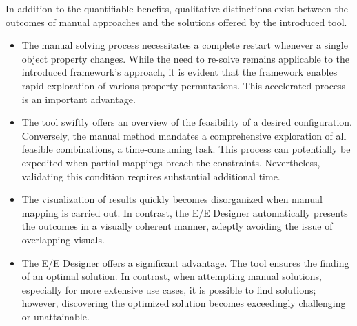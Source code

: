     In addition to the quantifiable benefits, qualitative distinctions exist between the outcomes of manual approaches and the solutions offered by the introduced tool.
    \begin{itemize}
        \item The manual solving process necessitates a complete restart whenever a single object property changes. While the need to re-solve remains applicable to the introduced framework's approach, it is evident that the framework enables rapid exploration of various property permutations. This accelerated process is an important advantage.
        \item The tool swiftly offers an overview of the feasibility of a desired configuration. Conversely, the manual method mandates a comprehensive exploration of all feasible combinations, a time-consuming task. This process can potentially be expedited when partial mappings breach the constraints. Nevertheless, validating this condition requires substantial additional time.
        \item The visualization of results quickly becomes disorganized when manual mapping is carried out. In contrast, the E/E Designer automatically presents the outcomes in a visually coherent manner, adeptly avoiding the issue of overlapping visuals.
        \item  The E/E Designer offers a significant advantage. The tool ensures the finding of an optimal solution. In contrast, when attempting manual solutions, especially for more extensive use cases, it is possible to find solutions; however, discovering the optimized solution becomes exceedingly challenging or unattainable.
    \end{itemize}
     
    



    

